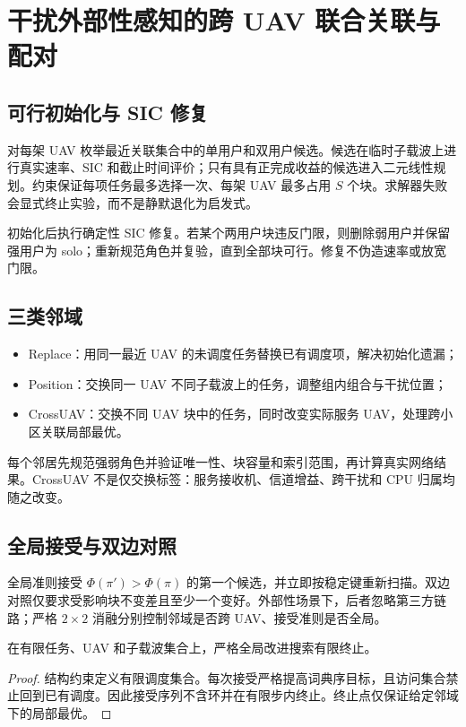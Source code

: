 \chapter{干扰外部性感知的跨 UAV 联合关联与配对}
\section{可行初始化与 SIC 修复}
对每架 UAV 枚举最近关联集合中的单用户和双用户候选。候选在临时子载波上进行真实速率、SIC 和截止时间评价；只有具有正完成收益的候选进入二元线性规划。约束保证每项任务最多选择一次、每架 UAV 最多占用 $S$ 个块。求解器失败会显式终止实验，而不是静默退化为启发式。

初始化后执行确定性 SIC 修复。若某个两用户块违反门限，则删除弱用户并保留强用户为 solo；重新规范角色并复验，直到全部块可行。修复不伪造速率或放宽门限。

\section{三类邻域}
\begin{itemize}
 \item Replace：用同一最近 UAV 的未调度任务替换已有调度项，解决初始化遗漏；
 \item Position：交换同一 UAV 不同子载波上的任务，调整组内组合与干扰位置；
 \item CrossUAV：交换不同 UAV 块中的任务，同时改变实际服务 UAV，处理跨小区关联局部最优。
\end{itemize}
每个邻居先规范强弱角色并验证唯一性、块容量和索引范围，再计算真实网络结果。CrossUAV 不是仅交换标签：服务接收机、信道增益、跨干扰和 CPU 归属均随之改变。

\section{全局接受与双边对照}
全局准则接受 $\Phi(\pi')>\Phi(\pi)$ 的第一个候选，并立即按稳定键重新扫描。双边对照仅要求受影响块不变差且至少一个变好。外部性场景下，后者忽略第三方链路；严格 $2\times2$ 消融分别控制邻域是否跨 UAV、接受准则是否全局。

\begin{proposition}
在有限任务、UAV 和子载波集合上，严格全局改进搜索有限终止。
\end{proposition}
\begin{proof}
结构约束定义有限调度集合。每次接受严格提高词典序目标，且访问集合禁止回到已有调度。因此接受序列不含环并在有限步内终止。终止点仅保证给定邻域下的局部最优。
\end{proof}


